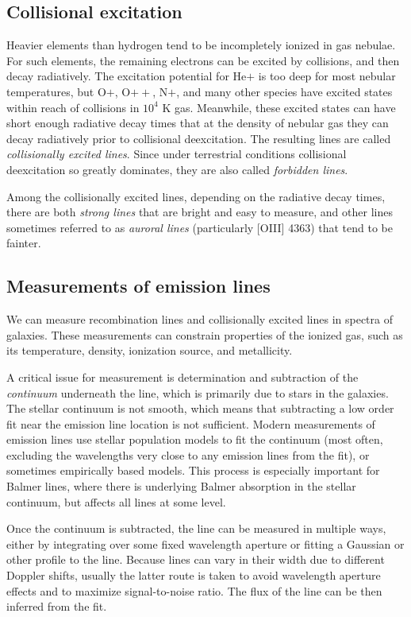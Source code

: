 \subsection{Collisional excitation}

Heavier elements than hydrogen tend to be incompletely ionized in gas
nebulae. For such elements, the remaining electrons can be excited by
collisions, and then decay radiatively. The excitation potential for
He$+$ is too deep for most nebular temperatures, but O$+$, O$++$,
N$+$, and many other species have excited states within reach of
collisions in $10^4$ K gas. Meanwhile, these excited states can have
short enough radiative decay times that at the density of nebular gas
they can decay radiatively prior to collisional deexcitation. The
resulting lines are called {\it collisionally excited lines}. Since
under terrestrial conditions collisional deexcitation so greatly
dominates, they are also called {\it forbidden lines}.

Among the collisionally excited lines, depending on the radiative
decay times, there are both {\it strong lines} that are bright and
easy to measure, and other lines sometimes referred to as {\it auroral
lines} (particularly [OIII] 4363) that tend to be fainter.

\subsection{Measurements of emission lines}

We can measure recombination lines and collisionally excited lines in
spectra of galaxies.  These measurements can constrain properties of
the ionized gas, such as its temperature, density, ionization source,
and metallicity.

A critical issue for measurement is determination and subtraction of
the {\it continuum} underneath the line, which is primarily due to
stars in the galaxies. The stellar continuum is not smooth, which
means that subtracting a low order fit near the emission line location
is not sufficient. Modern measurements of emission lines use stellar
population models to fit the continuum (most often, excluding the
wavelengths very close to any emission lines from the fit), or
sometimes empirically based models.  This process is especially
important for Balmer lines, where there is underlying Balmer
absorption in the stellar continuum, but affects all lines at some
level.

Once the continuum is subtracted, the line can be measured in multiple
ways, either by integrating over some fixed wavelength aperture or
fitting a Gaussian or other profile to the line. Because lines can
vary in their width due to different Doppler shifts, usually the
latter route is taken to avoid wavelength aperture effects and to
maximize signal-to-noise ratio. The flux of the line can be then
inferred from the fit.

